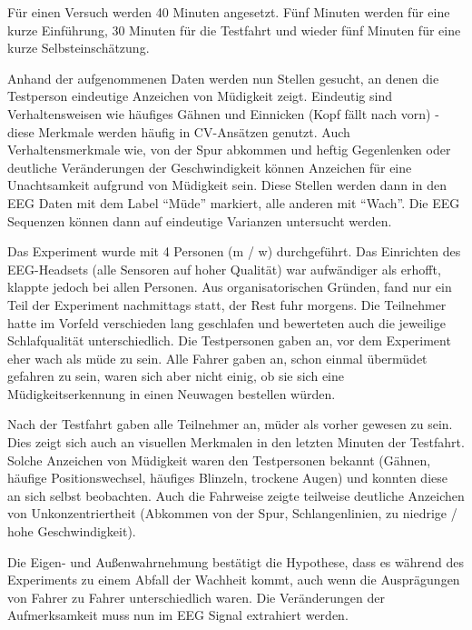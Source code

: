 Für einen Versuch werden 40 Minuten angesetzt. Fünf Minuten werden für eine kurze Einführung, 30 Minuten für die Testfahrt und wieder fünf Minuten für eine kurze Selbsteinschätzung.

Anhand der aufgenommenen Daten werden nun Stellen gesucht, an denen die Testperson eindeutige Anzeichen von Müdigkeit zeigt. Eindeutig sind Verhaltensweisen wie häufiges Gähnen und Einnicken (Kopf fällt nach vorn) - diese Merkmale werden häufig in CV-Ansätzen genutzt. 
Auch Verhaltensmerkmale wie, von der Spur abkommen und heftig Gegenlenken oder deutliche Veränderungen der Geschwindigkeit können Anzeichen für eine Unachtsamkeit aufgrund von Müdigkeit sein. Diese Stellen werden dann in den EEG Daten mit dem Label "`Müde"' markiert, alle anderen mit "`Wach"'. Die EEG Sequenzen können dann auf eindeutige Varianzen untersucht werden. 

Das Experiment wurde mit 4 Personen (m / w) durchgeführt. Das Einrichten des EEG-Headsets (alle Sensoren auf hoher Qualität) war aufwändiger als erhofft, klappte jedoch bei allen Personen. Aus organisatorischen Gründen, fand nur ein Teil der Experiment nachmittags statt, der Rest fuhr morgens. Die Teilnehmer hatte im Vorfeld verschieden lang geschlafen und bewerteten auch die jeweilige Schlafqualität unterschiedlich. Die Testpersonen gaben an, vor dem Experiment eher wach als müde zu sein. Alle Fahrer gaben an, schon einmal übermüdet gefahren zu sein, waren sich aber nicht einig, ob sie sich eine Müdigkeitserkennung in einen Neuwagen bestellen würden.

Nach der Testfahrt gaben alle Teilnehmer an, müder als vorher gewesen zu sein. Dies zeigt sich auch an visuellen Merkmalen in den letzten Minuten der Testfahrt. Solche Anzeichen von Müdigkeit waren den Testpersonen bekannt (Gähnen, häufige Positionswechsel, häufiges Blinzeln, trockene Augen) und konnten diese an sich selbst beobachten. Auch die Fahrweise zeigte teilweise deutliche Anzeichen von Unkonzentriertheit (Abkommen von der Spur, Schlangenlinien, zu niedrige / hohe Geschwindigkeit).

Die Eigen- und Außenwahrnehmung bestätigt die Hypothese, dass es während des Experiments zu einem Abfall der Wachheit kommt, auch wenn die Ausprägungen von Fahrer zu Fahrer unterschiedlich waren. Die Veränderungen der Aufmerksamkeit muss nun im EEG Signal extrahiert werden.